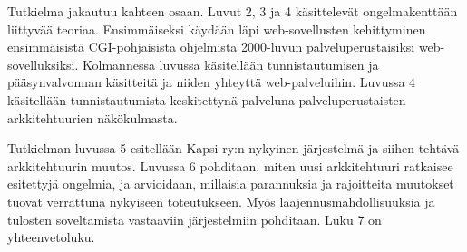 Tutkielma jakautuu kahteen osaan. Luvut 2, 3 ja 4 käsittelevät ongelmakenttään liittyvää teoriaa. Ensimmäiseksi käydään läpi web-sovellusten kehittyminen ensimmäisistä CGI-pohjaisista ohjelmista 2000-luvun palveluperustaisiksi web-sovelluksiksi. Kolmannessa luvussa käsitellään tunnistautumisen ja pääsynvalvonnan käsitteitä ja niiden yhteyttä web-palveluihin. Luvussa 4 käsitellään tunnistautumista keskitettynä palveluna palveluperustaisten arkkitehtuurien näkökulmasta.

Tutkielman luvussa 5 esitellään Kapsi ry:n nykyinen järjestelmä ja siihen tehtävä arkkitehtuurin muutos. Luvussa 6 pohditaan, miten uusi arkkitehtuuri ratkaisee esitettyjä ongelmia, ja arvioidaan, millaisia parannuksia ja rajoitteita muutokset tuovat verrattuna nykyiseen toteutukseen. Myös laajennusmahdollisuuksia ja tulosten soveltamista vastaaviin järjestelmiin pohditaan. Luku 7 on yhteenvetoluku.